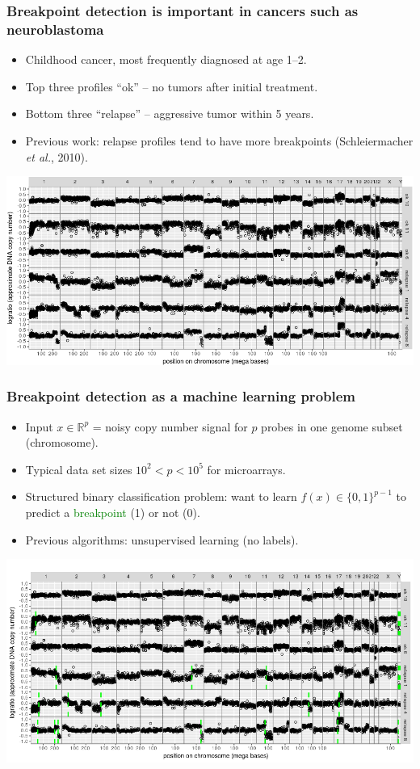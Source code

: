 \documentclass{beamer}
\begin{document}
\begin{frame}
  \frametitle{Breakpoint detection is important in cancers such as
    neuroblastoma } 

  \begin{itemize}
  \item Childhood cancer, most frequently diagnosed at age 1--2.
  \item Top three profiles ``ok'' -- no tumors after initial treatment.
  \item Bottom three ``relapse'' -- aggressive tumor within 5 years.
  \item Previous work: relapse profiles tend to have more breakpoints
     (Schleiermacher {\it et al.}, 2010).
  \end{itemize}

  \includegraphics[width=\textwidth]{neuroblastoma-ok-relapse}
\end{frame}

\begin{frame}
  \frametitle{Breakpoint detection as a machine learning problem}
  
  \begin{itemize}
  \item Input $x\in\mathbb R^p$ = noisy copy number signal for $p$
    probes in one genome subset (chromosome).
  \item Typical data set sizes $10^2 < p < 10^5$ for microarrays.
  \item Structured binary classification problem: want to learn
    $f(x)\in\{0,1\}^{p-1}$ to predict a 
    \textcolor{green}{breakpoint} (1) or not (0).
  \item Previous algorithms: unsupervised learning (no labels).
  \end{itemize}

  \includegraphics[width=\textwidth]{neuroblastoma-ok-relapse-pred}
\end{frame}
\end{document}
